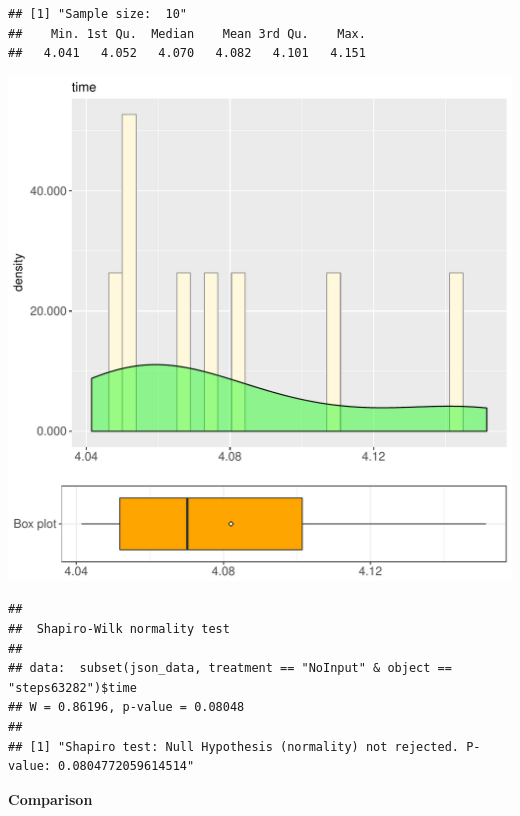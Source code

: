 \documentclass{article}\usepackage[]{graphicx}\usepackage[]{color}
\makeatletter
\def\maxwidth{ %
  \ifdim\Gin@nat@width>\linewidth
    \linewidth
  \else
    \Gin@nat@width
  \fi
}
\newenvironment{kframe}{%
 \def\at@end@of@kframe{}%
 \ifinner\ifhmode%
  \def\at@end@of@kframe{\end{minipage}}%
  \begin{minipage}{\columnwidth}%
 \fi\fi%
 \def\FrameCommand##1{\hskip\@totalleftmargin \hskip-\fboxsep
 \colorbox{shadecolor}{##1}\hskip-\fboxsep
     \hskip-\linewidth \hskip-\@totalleftmargin \hskip\columnwidth}%
 \MakeFramed {\advance\hsize-\width
   \@totalleftmargin\z@ \linewidth\hsize
   \@setminipage}}%
 {\par\unskip\endMakeFramed%
 \at@end@of@kframe}
\newenvironment{knitrout}{}{} %
\makeatother
\begin{document}
\begin{knitrout}
\color{fgcolor}\begin{kframe}
\begin{verbatim}
## [1] "Sample size:  10"
##    Min. 1st Qu.  Median    Mean 3rd Qu.    Max. 
##   4.041   4.052   4.070   4.082   4.101   4.151
\end{verbatim}
\end{kframe}
\includegraphics[width=\maxwidth]{figure/RH4_NoInput_steps63282-1} 
\begin{kframe}\begin{verbatim}
## 
## 	Shapiro-Wilk normality test
## 
## data:  subset(json_data, treatment == "NoInput" & object == "steps63282")$time
## W = 0.86196, p-value = 0.08048
## 
## [1] "Shapiro test: Null Hypothesis (normality) not rejected. P-value: 0.0804772059614514"
\end{verbatim}
\end{kframe}
\end{knitrout}
  
 \textbf{Comparison}
  
\end{document}
